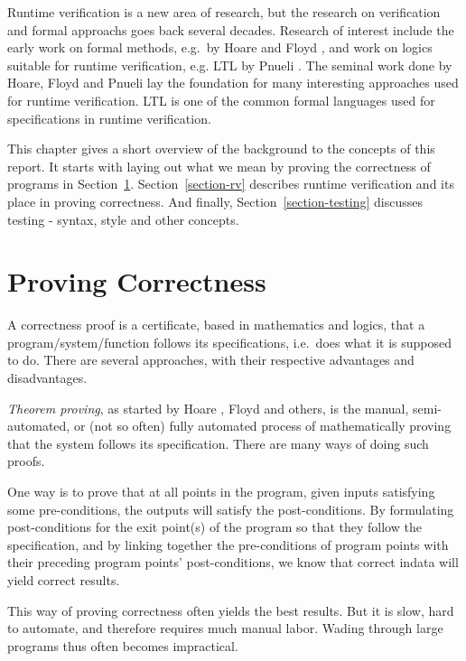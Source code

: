 \documentclass[a4paper,11pt]{kth-mag}
\begin{document}
Runtime verification is a new area of research, but the research on
verification and formal approachs goes back several decades. Research of interest
include the early work on formal methods, e.g.\ by Hoare \cite{hoare69} and
Floyd \cite{floyd67}, and work on logics suitable for runtime verification,
e.g. LTL by Pnueli \cite{pnueli77}. The seminal work done by Hoare, Floyd and
Pnueli lay the foundation for many interesting approaches used for runtime
verification. LTL is one of the common formal languages used for specifications
in runtime verification.

This chapter gives a short overview of the background to the concepts of this
report. It starts with laying out what we mean by proving the correctness of
programs in Section~\ref{section-proving-correctness}. Section~\ref{section-rv}
describes runtime verification and its place in proving correctness. And
finally, Section~\ref{section-testing} discusses testing - syntax, style and
other concepts.


\section{Proving Correctness} \label{section-proving-correctness}

A correctness proof is a certificate, based in mathematics and logics, that a
program/system/function follows its specifications, i.e.\ does what it is
supposed to do. There are several approaches, with their respective advantages
and disadvantages.

\textit{Theorem proving}, as started by Hoare \cite{hoare69}, Floyd
\cite{floyd67} and others, is the manual, semi-automated, or (not so often)
fully automated process of mathematically proving that the system follows its
specification. There are many ways of doing such proofs.

One way is to prove that at all points in the program, given inputs satisfying
some pre-conditions, the outputs will satisfy the post-conditions. By
formulating post-conditions for the exit point(s) of the program so that they
follow the specification, and by linking together the pre-conditions of program
points with their preceding program points' post-conditions, we know that
correct indata will yield correct results.

This way of proving correctness often yields the best results. But it is slow,
hard to automate, and therefore requires much manual labor. Wading through
large programs thus often becomes impractical.
\end{document}
